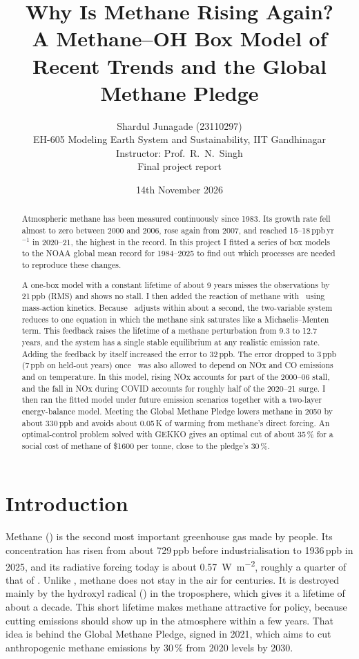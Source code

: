 \documentclass[11pt,a4paper]{article}
\title{\textbf{Why Is Methane Rising Again?}\\[2pt]
\large A Methane--OH Box Model of Recent Trends and the Global Methane Pledge}
\author{Shardul Junagade (23110297)\\[2pt]
\small EH-605 Modeling Earth System and Sustainability, IIT Gandhinagar\\
\small Instructor: Prof.\ R.\ N.\ Singh\\[2pt]
\small Final project report}
\date{14th November 2026}
\newcommand{\CH}{\ce{CH4}}
\newcommand{\OH}{\ce{OH}}
\begin{document}
\maketitle

\begin{abstract}
\noindent
Atmospheric methane has been measured continuously since 1983. Its growth rate fell almost to zero between 2000 and 2006, rose again from 2007, and reached 15--18\,ppb\,yr$^{-1}$ in 2020--21, the highest in the record. In this project I fitted a series of box models to the NOAA global mean record for 1984--2025 to find out which processes are needed to reproduce these changes.

A one-box model with a constant lifetime of about 9 years misses the observations by 21\,ppb (RMS) and shows no stall. I then added the reaction of methane with \OH\ using mass-action kinetics. Because \OH\ adjusts within about a second, the two-variable system reduces to one equation in which the methane sink saturates like a Michaelis--Menten term. This feedback raises the lifetime of a methane perturbation from 9.3 to 12.7 years, and the system has a single stable equilibrium at any realistic emission rate. Adding the feedback by itself increased the error to 32\,ppb. The error dropped to 3\,ppb (7\,ppb on held-out years) once \OH\ was also allowed to depend on NOx and CO emissions and on temperature. In this model, rising NOx accounts for part of the 2000--06 stall, and the fall in NOx during COVID accounts for roughly half of the 2020--21 surge. I then ran the fitted model under future emission scenarios together with a two-layer energy-balance model. Meeting the Global Methane Pledge lowers methane in 2050 by about 330\,ppb and avoids about 0.05\,K of warming from methane's direct forcing. An optimal-control problem solved with GEKKO gives an optimal cut of about 35\,\% for a social cost of methane of \$1600 per tonne, close to the pledge's 30\,\%.
\end{abstract}

\section{Introduction}

Methane (\CH) is the second most important greenhouse gas made by people. Its concentration has risen from about 729\,ppb before industrialisation to 1936\,ppb in 2025, and its radiative forcing today is about \SI{0.57}{W.m^{-2}}, roughly a quarter of that of . Unlike , methane does not stay in the air for centuries. It is destroyed mainly by the hydroxyl radical (\OH) in the troposphere, which gives it a lifetime of about a decade. This short lifetime makes methane attractive for policy, because cutting emissions should show up in the atmosphere within a few years. That idea is behind the Global Methane Pledge, signed in 2021, which aims to cut anthropogenic methane emissions by 30\,\% from 2020 levels by 2030.
\end{document}
